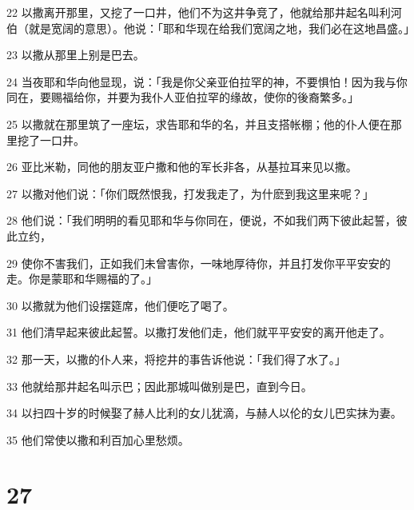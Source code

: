 \par 22 以撒离开那里，又挖了一口井，他们不为这井争竞了，他就给那井起名叫利河伯（就是宽阔的意思）。他说：「耶和华现在给我们宽阔之地，我们必在这地昌盛。」
\par 23 以撒从那里上别是巴去。
\par 24 当夜耶和华向他显现，说：「我是你父亲亚伯拉罕的神，不要惧怕！因为我与你同在，要赐福给你，并要为我仆人亚伯拉罕的缘故，使你的後裔繁多。」
\par 25 以撒就在那里筑了一座坛，求告耶和华的名，并且支搭帐棚；他的仆人便在那里挖了一口井。
\par 26 亚比米勒，同他的朋友亚户撒和他的军长非各，从基拉耳来见以撒。
\par 27 以撒对他们说：「你们既然恨我，打发我走了，为什麽到我这里来呢？」
\par 28 他们说：「我们明明的看见耶和华与你同在，便说，不如我们两下彼此起誓，彼此立约，
\par 29 使你不害我们，正如我们未曾害你，一味地厚待你，并且打发你平平安安的走。你是蒙耶和华赐福的了。」
\par 30 以撒就为他们设摆筵席，他们便吃了喝了。
\par 31 他们清早起来彼此起誓。以撒打发他们走，他们就平平安安的离开他走了。
\par 32 那一天，以撒的仆人来，将挖井的事告诉他说：「我们得了水了。」
\par 33 他就给那井起名叫示巴；因此那城叫做别是巴，直到今日。
\par 34 以扫四十岁的时候娶了赫人比利的女儿犹滴，与赫人以伦的女儿巴实抹为妻。
\par 35 他们常使以撒和利百加心里愁烦。

\chapter{27}

